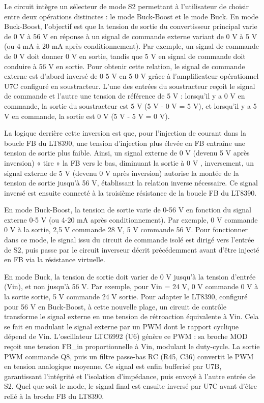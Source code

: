 Le circuit intègre un sélecteur de mode S2 permettant à l'utilisateur de choisir entre deux opérations distinctes : le mode Buck-Boost et le mode Buck. En mode Buck-Boost, l'objectif est que la tension de sortie du convertisseur principal varie de 0 V à 56 V en réponse à un signal de commande externe variant de 0 V à 5 V (ou 4 mA à 20 mA après conditionnement). Par exemple, un signal de commande de 0 V doit donner 0 V en sortie, tandis que 5 V en signal de commande doit conduire à 56 V en sortie. Pour obtenir cette relation, le signal de commande externe est d'abord inversé de 0-5 V en 5-0 V grâce à l'amplificateur opérationnel U7C configuré en soustracteur. L'une des entrées du soustracteur reçoit le signal de commande et l'autre une tension de référence de 5 V : lorsqu'il y a 0 V en commande, la sortie du soustracteur est 5 V (5 V - 0 V = 5 V), et lorsqu'il y a 5 V en commande, la sortie est 0 V (5 V - 5 V = 0 V).

La logique derrière cette inversion est que, pour l'injection de courant dans la boucle FB du LT8390, une tension d'injection plus élevée en FB entraîne une tension de sortie plus faible. Ainsi, un signal externe de 0 V (devenu 5 V après inversion) « tire » la FB vers le bas, diminuant la sortie à 0 V , inversement, un signal externe de 5 V (devenu 0 V après inversion) autorise la montée de la tension de sortie jusqu'à 56 V, établissant la relation inverse nécessaire. Ce signal inversé est ensuite connecté à la troisième résistance de la boucle FB du LT8390.

En mode Buck-Boost, la tension de sortie varie de 0-56 V en fonction du signal externe 0-5 V (ou 4-20 mA après conditionnement). Par exemple, 0 V commande 0 V à la sortie, 2,5 V commande 28 V, 5 V commande 56 V. Pour fonctionner dans ce mode, le signal issu du circuit de commande isolé est dirigé vers l'entrée de S2, puis passe par le circuit inverseur décrit précédemment avant d'être injecté en FB via la résistance virtuelle.

En mode Buck, la tension de sortie doit varier de 0 V jusqu'à la tension d'entrée (Vin), et non jusqu'à 56 V. Par exemple, pour Vin = 24 V, 0 V commande 0 V à la sortie sortie, 5 V commande 24 V sortie. Pour adapter le LT8390, configuré pour 56 V en Buck-Boost, à cette nouvelle plage, un circuit de contrôle transforme le signal externe en une tension de rétroaction équivalente à Vin. Cela se fait en modulant le signal externe par un PWM dont le rapport cyclique dépend de Vin. L'oscillateur LTC6992 (U6) génère ce PWM : sa broche MOD reçoit une tension FB\_in proportionnelle à Vin, modulant le duty-cycle. La sortie PWM commande Q8, puis un filtre passe-bas RC (R45, C36) convertit le PWM en tension analogique moyenne. Ce signal est enfin bufferisé par U7B, garantissant l'intégrité et l'isolation d'impédance, puis envoyé à l'autre entrée de S2. Quel que soit le mode, le signal final est ensuite inversé par U7C avant d'être relié à la broche FB du LT8390.

